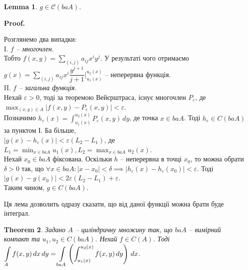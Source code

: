 \documentclass[a4paper, 10pt]{article}
\makeatletter
\def\qed{$\blacksquare$}
\theoremstyle{theoremdd}
\newtheorem{theorem}{Theorem}[subsection]
\theoremstyle{theoremdd}
\theoremstyle{theoremdd}
\theoremstyle{theoremdd}
\theoremstyle{theoremdd}
\theoremstyle{theoremdd}
\theoremstyle{theoremdd}
\theoremstyle{theoremdd}
\theoremstyle{theoremdd}
\theoremstyle{theoremdd}
\theoremstyle{theoremdd}
\theoremstyle{theoremdd}
\theoremstyle{theoremdd}
\newtheorem{lemma}[theorem]{Lemma}
\theoremstyle{theoremdd}
\theoremstyle{theoremdd}
\renewenvironment{proof}[1][Proof.\\]{\par
\pushQED{\hfill \qed}%
\normalfont \topsep6\p@\@plus6\p@\relax
\trivlist
\item\relax
{\bfseries
#1\@addpunct{.}}\hspace\labelsep\ignorespaces
}{%
\popQED\endtrivlist\@endpefalse
}
\makeatother
\begin{document}
\begin{lemma}
$g \in \mathcal{C}(baA)$.
\end{lemma}

\begin{proof}
Розглянемо два випадки:\\
I. \textit{$f$ -- многочлен}.\\
Тобто $f(x,y) = \displaystyle\sum_{(i,j)} a_{ij} x^i y^j$. У результаті чого отримаємо $g(x) = \displaystyle\sum_{(i,j)} a_{ij} x^i \dfrac{y^{j+1}}{j+1} \Big|_{u_1(x)}^{u_2(x)}$ -- неперервна функція.\\
II. \textit{$f$ -- загальна функція}. \\
Нехай $\varepsilon > 0$, тоді за теоремою Вейєрштраса, існує многочлен $P_\varepsilon$, де $\displaystyle\max_{(x,y) \in A} |f(x,y) - P_\varepsilon(x,y)| < \varepsilon$.\\
Позначимо $h_\varepsilon(x) = \displaystyle\int_{u_1(x)}^{u_2(x)}P_\varepsilon(x,y)\,dy$, де точка $x \in baA$. Тоді $h_\varepsilon \in C(baA)$ за пунктом І. Ба більше,\\
$|g(x)-h_\varepsilon(x)| < \varepsilon (L_2-L_1)$, де $L_1 = \displaystyle\min_{x \in baA} u_1(x), L_2 = \displaystyle\max_{x \in baA} u_2(x)$.\\
Нехай $x_0 \in baA$ фіксована. Оскільки $h$ -- неперервна в точці $x_0$, то можна обрати $\delta > 0$ так, що $\forall x \in baA: |x-x_0| < \delta \implies |h_\varepsilon(x)-h_\varepsilon(x_0)| < \varepsilon$. Тоді $|g(x)-g(x_0)| < 2\varepsilon(L_2-L_1)+\varepsilon$.\\
Таким чином, $g \in C(baA)$.
\end{proof}

Ця лема дозволить одразу сказати, що від даної функції можна брати буде інтеграл.

\begin{theorem}
Задано $A$ -- циліндричну множину так, що $baA$ -- вимірний компакт та $u_1,u_2 \in C(baA)$. Нехай $f \in C(A)$. Тоді $\displaystyle\int\displaylimits_A f(x,y)\,dx\,dy = \int\displaylimits_{baA} \left( \int_{u_1(x)}^{u_2(x)} f(x,y)\,dy \right)\,dx$.
\end{theorem}
\end{document}
